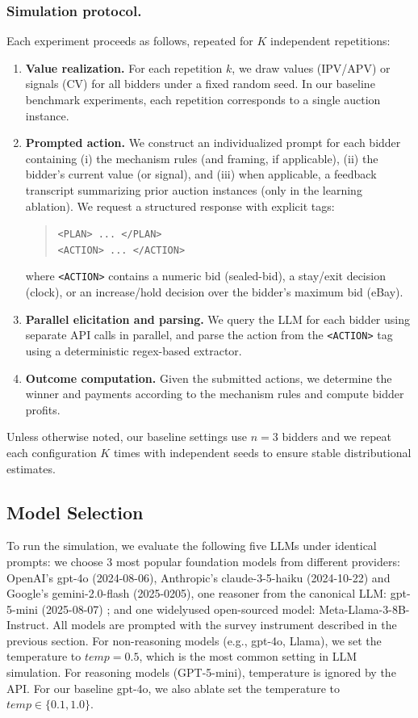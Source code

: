 \subsubsection{Simulation protocol.}
Each experiment proceeds as follows, repeated for $K$ independent repetitions:
\begin{enumerate}
    \item \textbf{Value realization.} For each repetition $k$, we draw values (IPV/APV) or signals (CV) for all bidders under a fixed random seed. In our baseline benchmark experiments, each repetition corresponds to a single auction instance.
    \item \textbf{Prompted action.} We construct an individualized prompt for each bidder containing (i) the mechanism rules (and framing, if applicable), (ii) the bidder's current value (or signal), and (iii) when applicable, a feedback transcript summarizing prior auction instances (only in the learning ablation). We request a structured response with explicit tags:
\begin{quote}\small
\verb|<PLAN> ... </PLAN>| \\
\verb|<ACTION> ... </ACTION>|
\end{quote}
where \verb|<ACTION>| contains a numeric bid (sealed-bid), a stay/exit decision (clock), or an increase/hold decision over the bidder's maximum bid (eBay).
    \item \textbf{Parallel elicitation and parsing.} We query the LLM for each bidder using separate API calls in parallel, and parse the action from the \verb|<ACTION>| tag using a deterministic regex-based extractor.
    \item \textbf{Outcome computation.} Given the submitted actions, we determine the winner and payments according to the mechanism rules and compute bidder profits.
\end{enumerate}

Unless otherwise noted, our baseline settings use $n=3$ bidders and we repeat each configuration $K$ times with independent seeds to ensure stable distributional estimates.


\subsection{Model Selection}

To run the simulation, we evaluate the following five LLMs under identical prompts:  we choose 3 most popular foundation models from different providers: OpenAI’s gpt-4o (2024-08-06),  Anthropic's claude-3-5-haiku (2024-10-22) and Google's gemini-2.0-flash (2025-0205), one reasoner from the canonical LLM: gpt-5-mini (2025-08-07) ; and one widelyused open-sourced model: Meta-Llama-3-8B-Instruct.
All models are prompted with the survey instrument described in the previous section.
For non-reasoning models (e.g., gpt-4o, Llama), we set the temperature to $temp = 0.5$,  which is the most common setting in LLM simulation\citep{horton2023large, Horton2024EDSL}. For reasoning models (GPT-5-mini), temperature is ignored by the API.
For our baseline gpt-4o, we also ablate set the temperature to  $ temp\in \{ 0.1, 1.0\}$.








